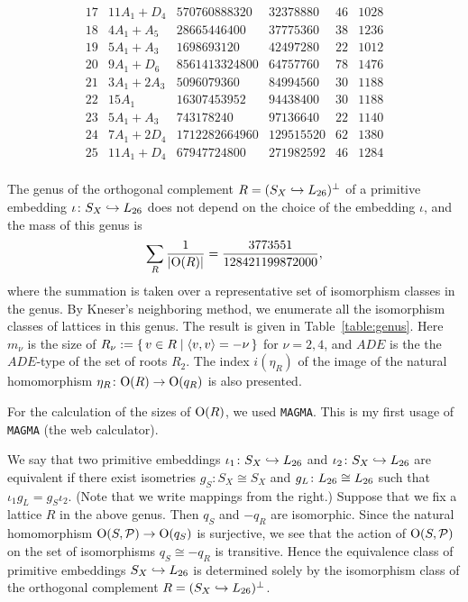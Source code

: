 \documentclass{amsart} %
\begin{document}
\begin{table}
\[\begin{array}{clrrrr}
17  &  11A_{1}+D_{4}  &  570760888320  &  32378880  &  46  &  1028  \\ 
18  &  4A_{1}+A_{5}  &  28665446400  &  37775360  &  38  &  1236  \\ 
19  &  5A_{1}+A_{3}  &  1698693120  &  42497280  &  22  &  1012  \\ 
20  &  9A_{1}+D_{6}  &  8561413324800  &  64757760  &  78  &  1476  \\ 
21  &  3A_{1}+2A_{3}  &  5096079360  &  84994560  &  30  &  1188  \\ 
22  &  15A_{1}  &  16307453952  &  94438400  &  30  &  1188  \\ 
23  &  5A_{1}+A_{3}  &  743178240  &  97136640  &  22  &  1140  \\ 
24  &  7A_{1}+2D_{4}  &  1712282664960  &  129515520  &  62  &  1380  \\ 
25  &  11A_{1}+D_{4}  &  67947724800  &  271982592  &  46  &  1284  \\
\end{array}
\]
\caption{Genus of $R$}\label{table:genus}
\end{table}
%
The genus of 
the  orthogonal complement $R=(S_X\hookrightarrow L_{26})^{\perp}$ of a primitive embedding $\iota\colon S_X\hookrightarrow L_{26}$  does not depend on
the choice of the embedding $\iota$,
and the mass of this genus is 
\[
\sum_{R} \frac{1}{|\mathord{\mathrm{O}}(R)|}=\frac{3773551}{128421199872000},
\]
where the summation is taken over a representative set of isomorphism classes in the genus.
By Kneser's neighboring method,
we enumerate all the isomorphism classes of lattices in this genus.
The result is given in Table~\ref{table:genus}.
Here $m_{\nu}$ is the size of $R_{\nu}:=\{\,{v\in R}\mid {\langle v,v \rangle=-\nu} \,\}$
for $\nu=2, 4$, 
and $ADE$ is the the $ADE$-type of 
the set of roots $R_2$.
The index $i(\eta_R)$ of the image of the natural homomorphism $\eta_R\colon \mathord{\mathrm{O}}(R)\to \mathord{\mathrm{O}}(q_R)$ is also presented.
%
\begin{remark}
For the calculation of the sizes of $\mathord{\mathrm{O}}(R)$,
we used {\tt MAGMA}.
This is my first usage of {\tt MAGMA} (the web calculator).
\end{remark}
%
We say that two primitive embeddings $\iota_1\colon S_X\hookrightarrow L_{26}$ and $\iota_2\colon S_X\hookrightarrow L_{26}$ are equivalent 
if there exist isometries $g_S\colon S_X\cong S_X$ and  $g_L\colon L_{26}\cong L_{26}$ such that 
$\iota_1  g_L=g_S\iota_2$.
(Note that we write mappings from the right.)
Suppose that we fix a lattice $R$ in the above genus.
Then $q_S$ and $-q_R$ are isomorphic.
Since  the natural homomorphism $\mathord{\mathrm{O}}(S, \mathord{\mathcal{P}})\to \mathord{\mathrm{O}}(q_S)$ is surjective,
we see that the action of $\mathord{\mathrm{O}}(S, \mathord{\mathcal{P}})$ on the set  of isomorphisms $q_S\cong -q_R$ is transitive.
Hence the equivalence  class of primitive embeddings $ S_X\hookrightarrow L_{26}$
is determined solely by  the isomorphism class of 
the orthogonal complement $R=(S_X\hookrightarrow L_{26})^{\perp}$.
%
%
\end{document}
